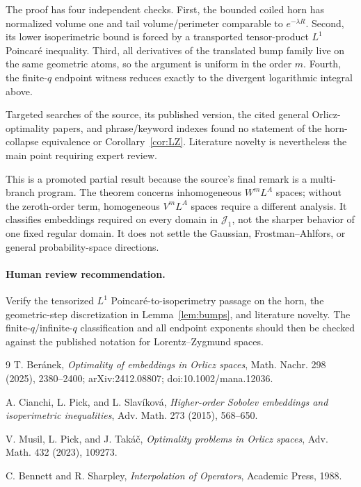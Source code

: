 \documentclass[11pt]{article}
\begin{document}
The proof has four independent checks.  First, the bounded coiled horn has
normalized volume one and tail volume/perimeter comparable to
$e^{-\lambda R}$.  Second, its lower isoperimetric bound is
forced by a transported tensor-product $L^1$ Poincar\'e inequality.  Third,
all derivatives of the translated bump family live on the same geometric
atoms, so the argument is uniform in the order $m$.  Fourth, the finite-$q$
endpoint witness reduces exactly to the divergent logarithmic integral above.

Targeted searches of the source, its published version, the cited general
Orlicz-optimality papers, and phrase/keyword indexes found no statement of the
horn-collapse equivalence or Corollary~\ref{cor:LZ}.  Literature novelty is
nevertheless the main point requiring expert review.

This is a promoted partial result because the source's final remark is a
multi-branch program.  The theorem concerns inhomogeneous $W^mL^A$ spaces;
without the zeroth-order term, homogeneous $V^mL^A$ spaces require a different
analysis.  It classifies embeddings required on every domain in
$\mathcal J_1$, not the sharper behavior of one fixed regular domain.  It does
not settle the Gaussian, Frostman--Ahlfors, or general probability-space
directions.

\paragraph{Human review recommendation.}
Verify the tensorized $L^1$ Poincar\'e-to-isoperimetry passage on the horn, the
geometric-step discretization in Lemma~\ref{lem:bumps}, and literature novelty.
The finite-$q$/infinite-$q$ classification and all endpoint exponents should
then be checked against the published notation for Lorentz--Zygmund spaces.

\begin{thebibliography}{9}
T. Ber\'anek, \emph{Optimality of embeddings in Orlicz spaces},
Math. Nachr. 298 (2025), 2380--2400; arXiv:2412.08807;
doi:10.1002/mana.12036.

A. Cianchi, L. Pick, and L. Slav\'ikov\'a,
\emph{Higher-order Sobolev embeddings and isoperimetric inequalities},
Adv. Math. 273 (2015), 568--650.

V. Musil, L. Pick, and J. Tak\'a\v{c},
\emph{Optimality problems in Orlicz spaces},
Adv. Math. 432 (2023), 109273.

C. Bennett and R. Sharpley, \emph{Interpolation of Operators},
Academic Press, 1988.
\end{thebibliography}
\end{document}
